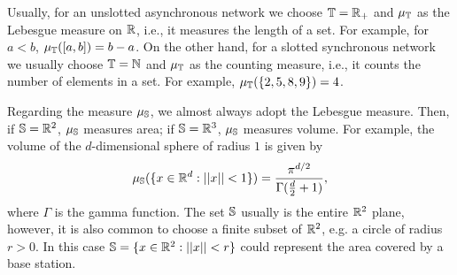 \begin{remark}
    Usually, for an unslotted asynchronous network we choose $\T = \R_+$ and $\mu_\T$ as the Lebesgue measure on $\R$, i.e., it measures the length of a set. For example, for $a<b$, $\mu_\T([a,b]) = b-a$.
    On the other hand, for a slotted synchronous network we usually choose $\T = \N$ and $\mu_\T$ as the counting measure, i.e., it counts the number of elements in a set. For example, $\mu_\T(\{2,5,8,9\}) = 4$.
    
    Regarding the measure $\mu_\S$, we almost always adopt the Lebesgue measure. Then, if $\S=\R^2$, $\mu_\S$ measures area; if $\S=\R^3$, $\mu_\S$ measures volume.
    For example, the volume of the $d$-dimensional sphere of radius $1$ is given by
    \[\mu_\S(\{x\in\R^d: ||x||<1\}) = \frac{\pi^{d/2}}{\Gamma(\frac{d}{2} + 1)},\]
    where $\Gamma$ is the gamma function.
    The set $\S$ usually is the entire $\R^2$ plane, however, it is also common to choose a finite subset of $\R^2$, e.g. a circle of radius $r>0$. In this case $\S = \{x\in\R^2: ||x|| < r\}$ could represent the area covered by a base station.
\end{remark}

